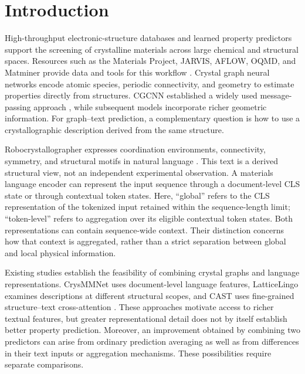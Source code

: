\documentclass[a4paper,fleqn]{cas-sc}
\begin{document}
\section{Introduction}
High-throughput electronic-structure databases and learned property predictors support the screening of crystalline materials across large chemical and structural spaces. Resources such as the Materials Project, JARVIS, AFLOW, OQMD, and Matminer provide data and tools for this workflow \citep{jain2013materialsproject,choudhary2020jarvis,curtarolo2012aflow,saal2013oqmd,ward2018matminer}. Crystal graph neural networks encode atomic species, periodic connectivity, and geometry to estimate properties directly from structures. CGCNN established a widely used message-passing approach \citep{xie2018cgcnn}, while subsequent models incorporate richer geometric information. For graph--text prediction, a complementary question is how to use a crystallographic description derived from the same structure.

Robocrystallographer expresses coordination environments, connectivity, symmetry, and structural motifs in natural language \citep{ganose2019robocrystallographer}. This text is a derived structural view, not an independent experimental observation. A materials language encoder can represent the input sequence through a document-level CLS state or through contextual token states. Here, ``global'' refers to the CLS representation of the tokenized input retained within the sequence-length limit; ``token-level'' refers to aggregation over its eligible contextual token states. Both representations can contain sequence-wide context. Their distinction concerns how that context is aggregated, rather than a strict separation between global and local physical information.

Existing studies establish the feasibility of combining crystal graphs and language representations. CrysMMNet uses document-level language features, LatticeLingo examines descriptions at different structural scopes, and CAST uses fine-grained structure--text cross-attention \citep{das2023crysmmnet,munjal2024latticelingo,lee2025cast}. These approaches motivate access to richer textual features, but greater representational detail does not by itself establish better property prediction. Moreover, an improvement obtained by combining two predictors can arise from ordinary prediction averaging as well as from differences in their text inputs or aggregation mechanisms. These possibilities require separate comparisons.
\end{document}
